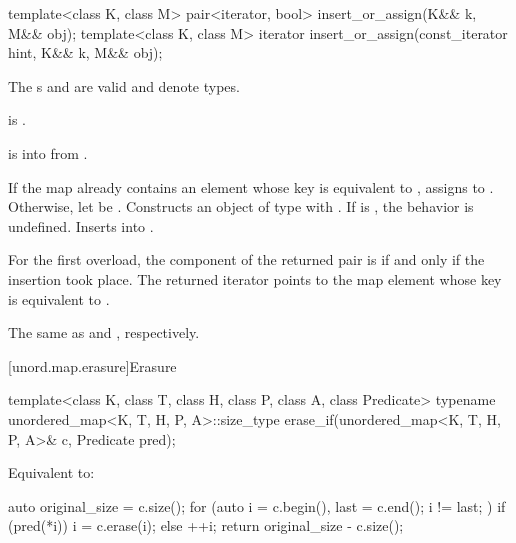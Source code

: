 %
\begin{itemdecl}
template<class K, class M>
  pair<iterator, bool> insert_or_assign(K&& k, M&& obj);
template<class K, class M>
  iterator insert_or_assign(const_iterator hint, K&& k, M&& obj);
\end{itemdecl}

\begin{itemdescr}
\pnum
\constraints
The s  and
 are valid and denote types.

\pnum
\mandates
{} is .

\pnum
\expects
{} is 
into 
from .

\pnum
\effects
If the map already contains an element 
whose key is equivalent to ,
assigns  to .
Otherwise, let  be .
Constructs an object  of type 
with .
If  is ,
the behavior is undefined.
Inserts  into .

\pnum
\returns
For the first overload,
the  component of the returned pair is 
if and only if the insertion took place.
The returned iterator points to the map element
whose key is equivalent to .

\pnum
\complexity
The same as  and , respectively.
\end{itemdescr}

[unord.map.erasure]{Erasure}

%
\begin{itemdecl}
template<class K, class T, class H, class P, class A, class Predicate>
  typename unordered_map<K, T, H, P, A>::size_type
    erase_if(unordered_map<K, T, H, P, A>& c, Predicate pred);
\end{itemdecl}

\begin{itemdescr}
\pnum
\effects
Equivalent to:
\begin{codeblock}
auto original_size = c.size();
for (auto i = c.begin(), last = c.end(); i != last; ) {
  if (pred(*i)) {
    i = c.erase(i);
  } else {
    ++i;
  }
}
return original_size - c.size();
\end{codeblock}
\end{itemdescr}

